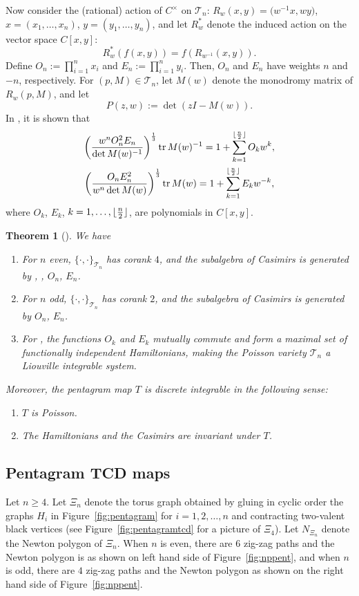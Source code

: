 \documentclass[10pt,a4paper]{amsart}
\numberwithin{equation}{section}
\newtheorem{Theorem}{Theorem}[section]
\DeclarePairedDelimiter\floor{\lfloor}{\rfloor}
\newcommand{\C}{{\mathbb C}}
\newcommand{\la}{\label}
\DeclareMathOperator{\tr}{tr}
\def\C{C}
\begin{document}
	Now consider the (rational) action of $\C^\times$ on $\mathcal T_n$: $R_w(x,y)=\big(w^{-1}x,wy\big)$, $x=(x_1,\dots,x_n)$, ${y=(y_1,\dots,y_n)}$,
	and let $R_w^*$ denote the induced action on the vector space $\C[x,y]$:
	\[
	R_w^*( f(x,y))= f(R_{w^{-1}}(x,y)).
	\]
	Define $O_n:=\prod_{i=1}^n x_i$ and $E_n:=\prod_{i=1}^n y_i$. Then, $O_n$ and $E_n$ have weights $n$ and $-n$, respectively. For $(p,M) \in \mathcal T_n$, let $M(w)$ denote the monodromy matrix of $R_w(p,M)$, and let
	\[
	P(z,w):= \det(zI-M(w)).
	\]
	In \cite{Schwartz}, it is shown that
	\begin{gather}
	\biggl(\frac{w^n O_n^2 E_n}{\det M(w)^{-1}}\biggr)^{\frac 1 3}\tr M(w)^{-1} = 1+ \sum_{k=1}^{\floor{\frac n 2}} O_k w^k, \nonumber\\
 \biggl(\frac{O_n E_n^2}{w^{n} \det M(w)}\biggr)^{\frac 1 3}\tr M(w) = 1+ \sum_{k=1}^{\floor{\frac n 2}} E_k w^{-k},\la{schinv}
	\end{gather}
	where $O_k$, $E_k$, $k=1,\dots,\floor{\frac n 2}$, are polynomials in $\C[x,y]$.
	\begin{Theorem}[\cite{OST1}]\la{thm:ost}
		We have
		\begin{enumerate}\itemsep=0pt
			\item[$1.$] For $n$ even, $\{\cdot,\cdot \}_{\mathcal T_n}$ has corank $4$, and the subalgebra of Casimirs is generated by , , $O_n$, $E_n$.
			\item[$2.$] For $n$ odd, $\{\cdot,\cdot \}_{\mathcal T_n}$ has corank $2$, and the subalgebra of Casimirs is generated by $O_n$, $E_n$.
			\item[$3.$] For , the functions $O_k$ and $E_k$ mutually commute and form a maximal set of functionally independent Hamiltonians, making the Poisson variety $\mathcal T_n$ a Liouville integrable system.
		\end{enumerate}
		Moreover, the pentagram map $T$ is discrete integrable in the following sense:
		\begin{enumerate}\itemsep=0pt
			\item[$4.$] $T$ is Poisson.
			\item[$5.$] The Hamiltonians and the Casimirs are invariant under $T$.
		\end{enumerate}
	\end{Theorem}
	
	\subsection{Pentagram TCD maps} \label{sec:pentagramtcd}
	Let $n \geq 4$. Let $\Xi_n$ denote the torus graph obtained by gluing in cyclic order the graphs $H_i$ in Figure~\ref{fig:pentagram} for $i=1,2,\dots,n$ and contracting two-valent black vertices (see Figure~\ref{fig:pentagramtcd} for a picture of $\Xi_4$).
	Let $N_{\Xi_n}$ denote the Newton polygon of $\Xi_n$.
	When $n$ is even, there are $6$ zig-zag paths and the Newton polygon is as shown on left hand side of Figure~\ref{fig:nppent}, and when $n$ is odd, there are $4$ zig-zag paths and the Newton polygon as shown on the right hand side of Figure~\ref{fig:nppent}.
	
\end{document}
